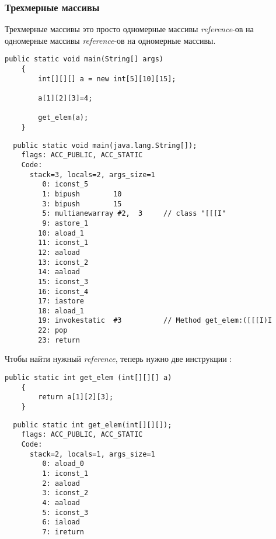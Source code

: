 \subsubsection{Трехмерные массивы}

Трехмерные массивы это просто одномерные массивы \emph{reference}-ов на одномерные массивы 
\emph{reference}-ов на одномерные массивы.

\begin{lstlisting}[style=customjava]
	public static void main(String[] args)
	{
		int[][][] a = new int[5][10][15];

		a[1][2][3]=4;

		get_elem(a);
	}
\end{lstlisting}

\begin{lstlisting}
  public static void main(java.lang.String[]);
    flags: ACC_PUBLIC, ACC_STATIC
    Code:
      stack=3, locals=2, args_size=1
         0: iconst_5      
         1: bipush        10
         3: bipush        15
         5: multianewarray #2,  3     // class "[[[I"
         9: astore_1      
        10: aload_1       
        11: iconst_1      
        12: aaload        
        13: iconst_2      
        14: aaload        
        15: iconst_3      
        16: iconst_4      
        17: iastore       
        18: aload_1       
        19: invokestatic  #3          // Method get_elem:([[[I)I
        22: pop           
        23: return        
\end{lstlisting}


Чтобы найти нужный \emph{reference}, теперь нужно две инструкции :

\begin{lstlisting}[style=customjava]
	public static int get_elem (int[][][] a)
	{
		return a[1][2][3];
	}
\end{lstlisting}

\begin{lstlisting}
  public static int get_elem(int[][][]);
    flags: ACC_PUBLIC, ACC_STATIC
    Code:
      stack=2, locals=1, args_size=1
         0: aload_0       
         1: iconst_1      
         2: aaload        
         3: iconst_2      
         4: aaload        
         5: iconst_3      
         6: iaload        
         7: ireturn       
\end{lstlisting}
